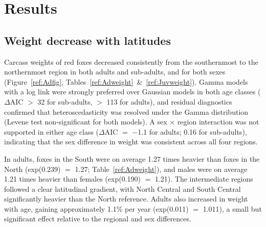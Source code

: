 \documentclass[12pt,a4paper,final,abstract=true,headings=small]{scrartcl}
\begin{document}

\section*{Results}

\subsection*{Weight decrease with latitudes}

Carcass weights of red foxes decreased consistently from the southernmost to the northernmost region in both adults and sub-adults, and for both sexes (Figure~\ref{ref:Adfig}, Tables~\ref{ref:Adweight}~\&~\ref{ref:Juvweight}). Gamma models with a log link were strongly preferred over Gaussian models in both age classes ($\Delta$AIC $>$ 32 for sub-adults, $>$ 113 for adults), and residual diagnostics confirmed that heteroscedasticity was resolved under the Gamma distribution (Levene test non-significant for both models). A sex $\times$ region interaction was not supported in either age class ($\Delta$AIC $=$ $-$1.1 for adults; 0.16 for sub-adults), indicating that the sex difference in weight was consistent across all four regions.

In adults, foxes in the South were on average 1.27 times heavier than foxes in the North (exp(0.239) $=$ 1.27; Table~\ref{ref:Adweight}), and males were on average 1.21 times heavier than females (exp(0.190) $=$ 1.21). The intermediate regions followed a clear latitudinal gradient, with North Central and South Central significantly heavier than the North reference. Adults also increased in weight with age, gaining approximately 1.1\% per year (exp(0.011) $=$ 1.011), a small but significant effect relative to the regional and sex differences.
\end{document}
